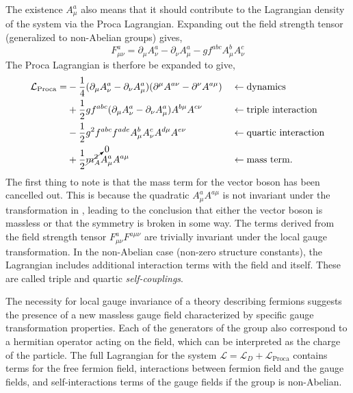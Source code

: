 The existence $A_\mu^a$ also means that it should contribute to the Lagrangian density of the system via the Proca Lagrangian.
Expanding out the field strength tensor (generalized to non-Abelian groups) gives,
\begin{equation}
	\label{eq:field_strength_tensor}
	F_{\mu\nu}^a = \partial_\mu A_\nu^a - \partial_\nu A_\mu^a - g f^{abc} A_\mu^b A_\nu^c
\end{equation}
The Proca Lagrangian is therfore be expanded to give,
\begin{align}
	\label{eq:boson}
	\mathcal{L}_\text{Proca} =
	 & -\frac{1}{4}(\partial_\mu A_\nu^a - \partial_\nu A_\mu^a) (\partial^\mu A^{a\nu} - \partial^\nu A^{a\mu}) &  & \leftarrow \text{dynamics}            \\
	 & + \frac{1}{2} g f^{abc} (\partial_\mu A_\nu^a - \partial_\nu A_\mu^a) A^{b\mu} A^{c\nu}                   &  & \leftarrow \text{triple interaction}  \\
	 & - \frac{1}{2} g^2 f^{abc} f^{ade} A_\mu^b A_\nu^c A^{d\mu} A^{e\nu}                                       &  & \leftarrow \text{quartic interaction} \\
	 & + \frac{1}{2} \cancelto{0}{m_A^2} A_\mu^a A^{a\mu}                                                        &  & \leftarrow \text{mass term}.
\end{align}
The first thing to note is that the mass term for the vector boson has been cancelled out.
This is because the quadratic $A_\mu^a A^{a\mu}$ is not invariant under the transformation in , leading to the conclusion that either the vector boson is massless or that the symmetry is broken in some way.
The terms derived from the field strength tensor $F_{\mu\nu}^a F^{a\mu\nu}$ are trivially invariant under the local gauge transformation.
In the non-Abelian case (non-zero structure constants), the Lagrangian includes additional interaction terms with the field and itself.
These are called triple and quartic \textit{self-couplings}.

The necessity for local gauge invariance of a theory describing fermions suggests the presence of a new massless gauge field characterized by specific gauge transformation properties.
Each of the generators of the group also correspond to a hermitian operator acting on the field, which can be interpreted as the charge of the particle.
The full Lagrangian for the system $\mathcal{L} = \mathcal{L}_D + \mathcal{L}_\text{Proca}$ contains terms for the free fermion field, interactions between fermion field and the gauge fields, and self-interactions terms of the gauge fields if the group is non-Abelian.

